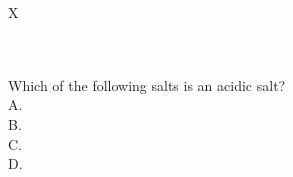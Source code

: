\begin{xltabular}{\textwidth}{X}
    \caption{\textbf{Examples for each required skill considered in the \chembench corpus.} The table shows the number of questions for each skill and an example question. Note that the total count in this table is bigger than the \chembench corpus. This is because the same question can be annotated with two different skills, e.g., Reasoning and Calculation.}    \label{tab:chembench_corpus_cognitive} \\
            \toprule
             \\
            \midrule
            Which of the following salts is an acidic salt? \\
            A.  \\
            B.  \\
            C.  \\
            D.  \\
            \midrule
             \\
            \midrule

\end{xltabular}
